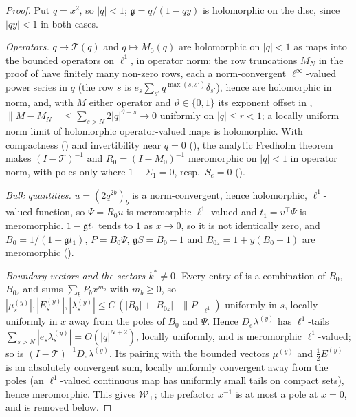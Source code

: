 \documentclass[11pt]{article}
\theoremstyle{plain}
\theoremstyle{definition}
\theoremstyle{remark}
\theoremstyle{plain}\newtheorem*{maintheorem}{Main Theorem}
\begin{document}
\begin{proof}
Put $q=x^2$, so $|q|<1$; $\mathfrak g=q/(1-qy)$ is holomorphic on the disc, since $|qy|<1$ in both
cases.

\emph{Operators.} $q\mapsto\mathcal T(q)$ and $q\mapsto M_0(q)$ are holomorphic on $|q|<1$ as maps
into the bounded operators on $\ell^1$, in operator norm: the row truncations $M_N$ in the proof of
{\cite[Lemma ``compactness and meromorphy'', \textup{lem:fred}]{Bonfioli2026bB}} have finitely many non-zero rows, each a norm-convergent $\ell^\infty$-valued
power series in $q$ (the row $s$ is $e_s\sum_{s'}q^{\max(s,s')}\delta_{s'}$), hence are
holomorphic in norm, and, with $M$ either operator and $\vartheta\in\{0,1\}$ its exponent offset in
\cite[Definition ``section identity'', \textup{def:model}]{Bonfioli2026bB}, $\|M-M_N\|\le\sum_{s>N}2|q|^{\vartheta+s}\to0$ uniformly on $|q|\le r<1$; a locally
uniform norm limit of holomorphic operator-valued maps is holomorphic. With compactness
({\cite[Lemma ``compactness and meromorphy'', \textup{lem:fred}]{Bonfioli2026bB}}) and invertibility near $q=0$ ({\cite[Lemma ``existence, uniqueness, analyticity'', \textup{lem:modelexist}]{Bonfioli2026bB}}), the analytic
Fredholm theorem makes $(I-\mathcal T)^{-1}$ and $R_0=(I-M_0)^{-1}$ meromorphic on $|q|<1$ in
operator norm, with poles only where $1-\Sigma_1=0$, resp.\ $S_e=0$ ({\cite[Corollary ``singularities of the two gapless resolvents'', \textup{cor:sing}]{Bonfioli2026bB}}).

\emph{Bulk quantities.} $u=(2q^{2b})_b$ is a norm-convergent, hence holomorphic, $\ell^1$-valued
function, so $\Psi=R_0u$ is meromorphic $\ell^1$-valued and $t_1=v^{\!\top}\Psi$ is meromorphic.
$1-\mathfrak gt_1$ tends to $1$ as $x\to0$, so it is not identically zero, and $B_0=1/(1-\mathfrak
gt_1)$, $P=B_0\Psi$, $\mathfrak gS=B_0-1$ and $B_{0z}=1+y(B_0-1)$ are meromorphic
({\cite[Remark ``the regrouping of $\mathcal W_0$'', \textup{M3:rem:W0regroup}]{Bonfioli2026bB}}).

\emph{Boundary vectors and the sectors $k^\ast\ne0$.} Every entry of
\cite[\textup{(eq:app-mu)}--\textup{(eq:app-lambda)}]{Bonfioli2026bB} is a combination of $B_0$, $B_{0z}$ and sums
$\sum_bP_bx^{m_b}$ with $m_b\ge0$, so $|\mu^{(y)}_s|,|E^{(y)}_s|,|\lambda^{(y)}_s|\le
C\,(|B_0|+|B_{0z}|+\|P\|_{\ell^1})$ uniformly in $s$, locally uniformly in $x$ away from the poles
of $B_0$ and $\Psi$. Hence $D_e\lambda^{(y)}$ has $\ell^1$-tails
$\sum_{s>N}|e_s\lambda^{(y)}_s|=O(|q|^{N+2})$, locally uniformly, and is meromorphic
$\ell^1$-valued; so is $(I-\mathcal T)^{-1}D_e\lambda^{(y)}$. Its pairing with the bounded vectors
$\mu^{(y)}$ and $\tfrac12E^{(y)}$ is an absolutely convergent sum, locally uniformly convergent
away from the poles (an $\ell^1$-valued continuous map has uniformly small tails on compact sets),
hence meromorphic. This gives $\mathcal W_\pm$; the prefactor $x^{-1}$ is at most a pole at $x=0$,
and is removed below.


\end{proof}
\end{document}
